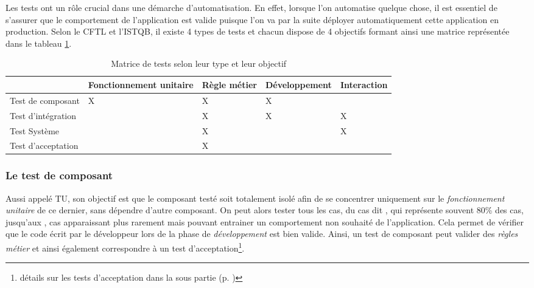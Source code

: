 Les tests ont un rôle crucial dans une démarche d'automatisation. En effet, lorsque l'on automatise quelque chose, il est essentiel de s'assurer que le comportement de l'application est valide puisque l'on va par la suite déployer automatiquement cette application en production. Selon le \gls{CFTL} et l'\gls{ISTQB}, il existe 4 types de tests et chacun dispose de 4 objectifs formant ainsi une matrice représentée dans le tableau \ref{tab:matrice-test}.

\begin{table}[H]
	\centering
	\begin{adjustbox}{width=0.95\textwidth,center=\textwidth} 
		\begin{tabular}{|l|l|l|l|l|}
			\hline
			\diagbox{type de test}{valide} & Fonctionnement unitaire & Règle métier & Développement & Interaction \\ \hline
			Test de composant     & X                       & X            & X              &             \\ \hline
			Test d'intégration    &                         & X            & X              & X           \\ \hline
			Test Système          &                         & X            &               & X           \\ \hline
			Test d'acceptation    &                         & X            &               &             \\ \hline
		\end{tabular}
	\end{adjustbox}
	\caption{Matrice de tests selon leur type et leur objectif}
	\label{tab:matrice-test}
\end{table}

\subsubsection{Le test de composant}\label{test-composant}

Aussi appelé \gls{TU}, son objectif est que le composant testé soit totalement isolé afin de se concentrer uniquement sur le \emph{fonctionnement unitaire} de ce dernier, sans dépendre d'autre composant. On peut alors tester tous les cas, du cas dit , qui représente souvent 80\% des cas, jusqu'aux , cas apparaissant plus rarement mais pouvant entrainer un comportement non souhaité de l'application. Cela permet de vérifier que le code écrit par le développeur lors de la phase de \emph{développement} est bien valide. Ainsi, un test de composant peut valider des \emph{règles métier} et ainsi également correspondre à un test d'acceptation\footnote{détails sur les tests d'acceptation dans la sous partie  (p. \pageref{test-acceptation})}.

